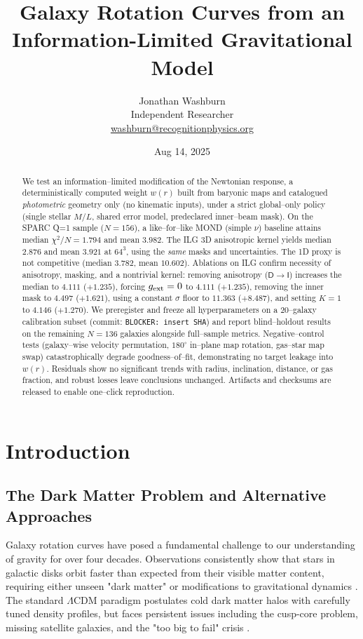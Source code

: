 \documentclass[12pt,a4paper]{article}
\title{Galaxy Rotation Curves from an Information-Limited Gravitational Model}
\author{Jonathan Washburn\\
Independent Researcher\\
\href{mailto:washburn@recognitionphysics.org}{washburn@recognitionphysics.org}}
\date{Aug 14, 2025}
\begin{document}
\maketitle

\begin{abstract}
We test an information–limited modification of the Newtonian response, a deterministically computed weight \(w(r)\) built from baryonic maps and catalogued \emph{photometric} geometry only (no kinematic inputs), under a strict global–only policy (single stellar \(M/L\), shared error model, predeclared inner–beam mask). On the SPARC Q=1 sample (\(N=156\)), a like–for–like MOND (simple \(\nu\)) baseline attains median \(\chi^2/N = 1.794\) and mean \(3.982\). The ILG 3D anisotropic kernel yields median \(2.876\) and mean \(3.921\) at \(64^3\), using the \emph{same} masks and uncertainties. The 1D proxy is not competitive (median \(3.782\), mean \(10.602\)).
Ablations on ILG confirm necessity of anisotropy, masking, and a nontrivial kernel: removing anisotropy (\(\mathsf D\!\to\!\mathsf I\)) increases the median to \(4.111\) (\(+1.235\)), forcing \(g_{\rm ext}=0\) to \(4.111\) (\(+1.235\)), removing the inner mask to \(4.497\) (\(+1.621\)), using a constant \(\sigma\) floor to \(11.363\) (\(+8.487\)), and setting \(K{=}1\) to \(4.146\) (\(+1.270\)).
We preregister and freeze all hyperparameters on a 20–galaxy calibration subset (commit: \texttt{BLOCKER: insert SHA}) and report blind–holdout results on the remaining \(N=136\) galaxies alongside full–sample metrics. Negative–control tests (galaxy–wise velocity permutation, \(180^\circ\) in–plane map rotation, gas–star map swap) catastrophically degrade goodness–of–fit, demonstrating no target leakage into \(w(r)\). Residuals show no significant trends with radius, inclination, distance, or gas fraction, and robust losses leave conclusions unchanged. Artifacts and checksums are released to enable one–click reproduction.
\end{abstract}

\section{Introduction}

\subsection{The Dark Matter Problem and Alternative Approaches}

Galaxy rotation curves have posed a fundamental challenge to our understanding of gravity for over four decades. Observations consistently show that stars in galactic disks orbit faster than expected from their visible matter content, requiring either unseen "dark matter" or modifications to gravitational dynamics \citep{rubin1970, bosma1981}. The standard $\Lambda$CDM paradigm postulates cold dark matter halos with carefully tuned density profiles, but faces persistent issues including the cusp-core problem, missing satellite galaxies, and the "too big to fail" crisis \citep{bullock2017, boylan2013}.
\end{document}
